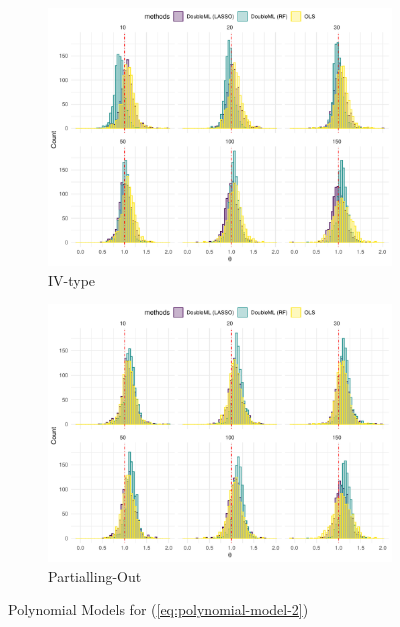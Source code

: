 \documentclass[en,12pt,mtpro2]{elegantpaper}
\begin{document}
\begin{figure}[htp]
    \centering
    \begin{subfigure}{.41\textwidth}
        \centering
        \includegraphics[width=\linewidth]{figures/simulation-polynomial6 (IV-type).pdf}
        \caption{IV-type}
    \end{subfigure}
    \begin{subfigure}{.41\textwidth}
        \centering
        \includegraphics[width=\linewidth]{figures/simulation-polynomial6 (partialling out).pdf}
        \caption{Partialling-Out}
    \end{subfigure}
    \caption{Polynomial Models for (\ref{eq:polynomial-model-2})}
\end{figure}
\clearpage
\end{document}

